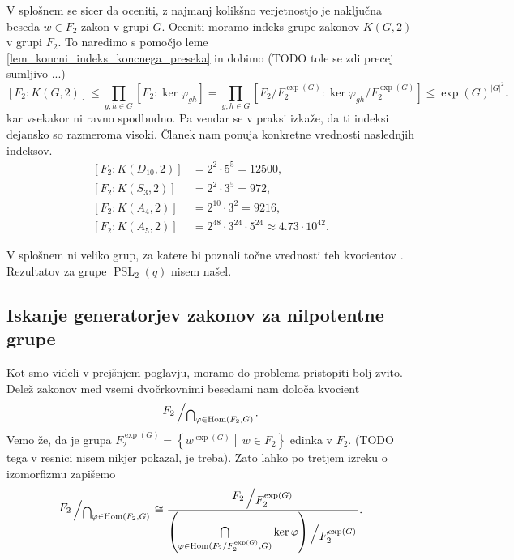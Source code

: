 V splošnem se sicer da oceniti, z najmanj kolikšno verjetnostjo je naključna beseda $w \in F_2$ zakon v grupi $G$.
Oceniti moramo indeks grupe zakonov $K(G, 2)$ v grupi $F_2$. To naredimo s pomočjo leme \ref{lem_koncni_indeks_koncnega_preseka} in dobimo (TODO tole se zdi precej sumljivo ...)
\begin{equation*}
\left[ F_2 : K(G, 2) \right] \le \prod_{g, h \in G} [F_2 : \ker \varphi_{gh}] = \prod_{g, h \in G} [F_2 / F_2^{\exp(G)} : \ker \varphi_{gh}  / F_2^{\exp(G)}] \le {\exp(G)}^{\lvert G \rvert^2}.
\end{equation*}  
kar vsekakor ni ravno spodbudno. Pa vendar se v praksi izkaže, da ti indeksi dejansko so razmeroma visoki. Članek \cite{Cocke_2020} nam ponuja konkretne vrednosti naslednjih indeksov.
\begin{align*}
    \left[ F_2 : K(D_{10}, 2) \right] &= 2^2 \cdot 5^{5} = 12500, \\
    \left[ F_2 : K(S_3, 2) \right] &= 2^2 \cdot 3^{5} = 972, \\
    \left[ F_2 : K(A_4, 2) \right] &= 2^{10} \cdot  3^{2} = 9216, \\
    \left[ F_2 : K(A_5, 2) \right] &= 2^{48} \cdot  3^{24} \cdot 5^{24} \approx 4.73 \cdot 10^{42}.   %
\end{align*}

V splošnem ni veliko grup, za katere bi poznali točne vrednosti teh kvocientov \cite[str.~1]{Cocke_2020}. Rezultatov za grupe $\operatorname{PSL}_2(q)$ nisem našel.

\subsection{Iskanje generatorjev zakonov za nilpotentne grupe}

Kot smo videli v prejšnjem poglavju, moramo do problema pristopiti bolj zvito. Delež zakonov med vsemi dvočrkovnimi besedami nam določa kvocient \begin{equation*}
\bigslant{F_2}{\bigcap_{\varphi \in \operatorname{Hom}(F_2, G)}}.  
\end{equation*}  
Vemo že, da je grupa $F_2^{\exp(G)} = \left\{ w^{\exp(G)}  \middle|\, w \in F_2 \right\}$ edinka v $F_2$. (TODO tega v resnici nisem nikjer pokazal, je treba).
Zato lahko po tretjem izreku o izomorfizmu zapišemo 
\begin{equation*}
    \bigslant{F_2}{\bigcap_{\varphi \in \operatorname{Hom}(F_2, G)}} \cong \dfrac{\bigslant{F_2}{F_2^{\exp(G)}}}{\bigslant{ \left( \bigcap\limits_{\varphi \in \operatorname{Hom}({F_2} / {F_2^{\exp(G)}}, G)} \ker \varphi \right) }{F_2^{\exp(G)}}}.
\end{equation*}  
  

